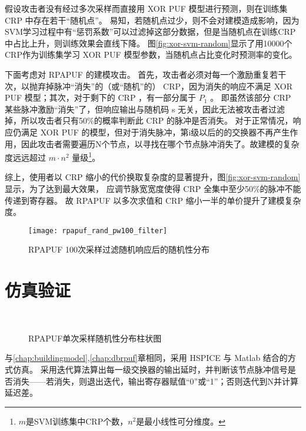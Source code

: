 假设攻击者没有经过多次采样而直接用 XOR PUF 模型进行预测，则在训练集 CRP 中存在若干``随机点''。
易知，若随机点过少，则不会对建模造成影响，因为SVM学习过程中有``惩罚系数''可以过滤掉这部分数据，但是当随机点在训练CRP中占比上升，则训练效果会直线下降。
图\ref{fig:xor-svm-random}显示了用10000个CRP作为训练集学习 XOR PUF 模型参数，当随机点占比变化时预测率的变化。

下面考虑对 RPAPUF 的建模攻击。
首先，攻击者必须对每一个激励重复若干次，以抛弃掉脉冲``消失''的（或``随机''的） CRP，因为消失的响应不满足 XOR PUF 模型；其次，对于剩下的 CRP ，有一部分属于 $ P_1 $ 。 即虽然该部分 CRP 某些脉冲激励``消失''了，但响应输出与随机码 s 无关，因此无法被攻击者过滤掉，所以攻击者只有50\%的概率判断此 CRP 的脉冲是否消失。
对于正常情况，响应仍满足 XOR PUF 的模型，但对于消失脉冲，第i级以后的的交换器不再产生作用，因此攻击者需要遍历N个节点，以寻找在哪个节点脉冲消失了。故建模的复杂度远远超过 $ m\cdot n^2 $ 量级\footnote{$ m $是SVM训练集中CRP个数，$ n^2 $是最小线性可分维度。}。

综上，使用者以 CRP 缩小的代价换取复杂度的显著提升，图\ref{fig:xor-svm-random}显示，为了达到最大效果， 应调节脉宽宽度使得 CRP 全集中至少50\%的脉冲不能传递到寄存器。
故 RPAPUF 以多次求值和 CRP 缩小一半的单价提升了建模复杂度。

\begin{figure}[htb!]
\centering
\texttt{[image: rpapuf\_rand\_pw100\_filter]}
\caption{RPAPUF 100次采样过滤随机响应后的随机性分布}
\label{fig:rpa-k100-rand}
\end{figure}

\section{仿真验证}\label{sec:rpa_simu}

\begin{figure}[htb!]
\centering
{}
\\
\caption{RPAPUF单次采样随机性分布柱状图}
\label{fig:rpa-single-rand}
\end{figure}

与\ref{chap:buildingmodel},\ref{chap:dbrpuf}章相同，采用 HSPICE 与 Matlab 结合的方式仿真。
采用迭代算法算出每一级交换器的输出延时，并判断该节点脉冲信号是否消失——若消失，则退出迭代，输出寄存器赋值``0''或``1''；否则迭代到N并计算延迟差。

